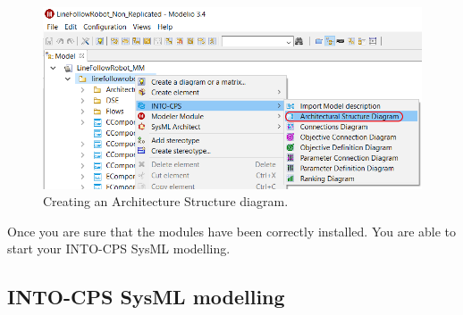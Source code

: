 %
\begin{figure}[hpt!]
\centering
\includegraphics[width=\textwidth]{./figures/sysml-create-architecturediagram.png}
\caption{Creating an Architecture Structure diagram.}
\label{figure:sysml-create-architecturediagram}
\end{figure}
%
Once you are sure that the modules have been correctly installed. You are able to start your INTO-CPS SysML modelling. 
 
\subsection{INTO-CPS SysML modelling}


